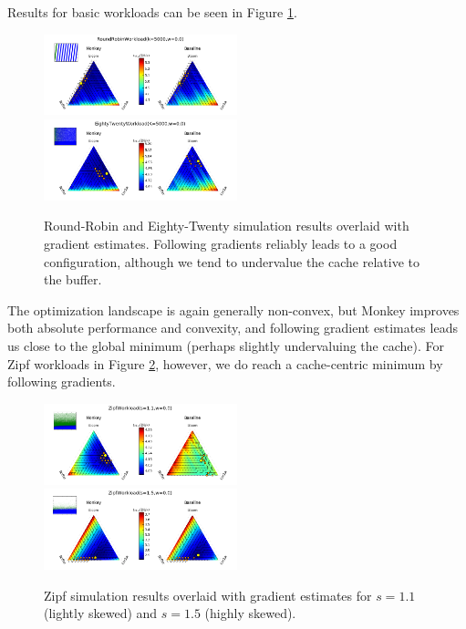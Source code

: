 \documentclass{sig-alternate-05-2015}
\begin{document}
Results for basic workloads can be seen in Figure \ref{fig:basicquiv}.

\begin{figure}[H]
\begin{center}
\includegraphics[width=0.5\textwidth]{robinquiv1.png}
\includegraphics[width=0.5\textwidth]{eightwenquiv1.png}
\end{center}
\caption{Round-Robin and Eighty-Twenty simulation results overlaid with gradient estimates. Following gradients reliably leads to a good configuration, although we tend to undervalue the cache relative to the buffer.}
\label{fig:basicquiv}
\end{figure}

The optimization landscape is again generally non-convex, but Monkey improves both absolute performance and convexity, and following gradient estimates leads us close to the global minimum (perhaps slightly undervaluing the cache). For Zipf workloads in Figure \ref{fig:zipfquiv}, however, we do reach a cache-centric minimum by following gradients.

\begin{figure}[H]
\begin{center}
\includegraphics[width=0.5\textwidth]{zipfquiv1.png}
\includegraphics[width=0.5\textwidth]{zipfquiv2.png}
\end{center}
\caption{Zipf simulation results overlaid with gradient estimates for $s=1.1$ (lightly skewed) and $s=1.5$ (highly skewed).}
\label{fig:zipfquiv}
\end{figure}
\end{document}
